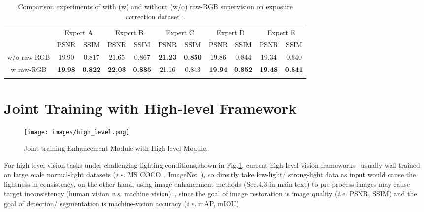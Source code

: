 \documentclass{bmvc2k}
\begin{document}
\begin{table}[t]
\caption{Comparison experiments of with (w) and without (w/o) raw-RGB supervision on exposure correction dataset~\cite{Exposure_2021_CVPR}.}
\centering
\begin{adjustbox}{max width = 0.95\linewidth}
\begin{tabular}{c|cc|cc|cc|cc|cc}
\Xhline{1.0pt}
\multirow{2}{*}{Method} & \multicolumn{2}{c|}{Expert A} & \multicolumn{2}{c|}{Expert B} & \multicolumn{2}{c|}{Expert C} & \multicolumn{2}{c|}{Expert D} & \multicolumn{2}{c}{Expert E} \\ \cline{2-11} 
                        & PSNR          & SSIM        & PSNR          & SSIM           & PSNR           & SSIM           & PSNR           & SSIM           & PSNR           & SSIM          \\ \Xhline{0.6pt}
w/o raw-RGB             & 19.90         & 0.817         & 21.65         & 0.867         & \textbf{21.23}         & \textbf{0.850}        & 19.86         & 0.844         & 19.34         & 0.840        \\ \hline
w raw-RGB               & \textbf{19.98}   & \textbf{0.822}     & \textbf{22.03}        & \textbf{0.885}         & 21.16         & 0.843         & \textbf{19.94}        & \textbf{0.852}         & \textbf{19.48}         & \textbf{0.841}        \\ \Xhline{1.0pt}
\end{tabular}
\end{adjustbox}
\label{Tab:RAW-RGB}
\end{table}


\section{Joint Training with High-level Framework}
\label{sec:joint-train}
\begin{figure}[h]
    \centering
    \texttt{[image: images/high\_level.png]}
    \caption{Joint training Enhancement Module with High-level Module.}
    \label{fig_high_level}
\end{figure}

For high-level vision tasks under challenging lighting conditions,shown in Fig.\ref{fig_high_level}, current high-level vision frameworks~\cite{DETR,yolov3,Deeplabv3plus} usually well-trained on large scale normal-light datasets (\textit{i.e.} MS COCO~\cite{coco_dataset}, ImageNet~\cite{imagenet}), so directly take low-light/ strong-light data as input would cause the lightness in-consistency, on the other hand, using image enhancement methods (Sec.4.3 in main text) to pre-process images may cause target inconsistency (human vision \textit{v.s.} machine vision)~\cite{ICCV_MAET}, since the goal of image restoration is image quality (\textit{i.e.} PSNR, SSIM) and the goal of detection/ segmentation is machine-vision accuracy (\textit{i.e.} mAP, mIOU).
\end{document}
